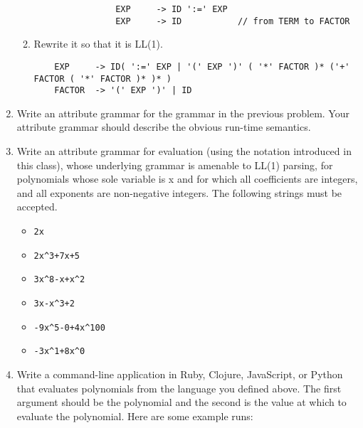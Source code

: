 \documentclass{article}
\begin{document}
\begin{enumerate}
\begin{enumerate}
            \begin{verbatim}
                EXP     -> ID ':=' EXP
                EXP     -> ID           // from TERM to FACTOR
            \end{verbatim}
            \item Rewrite it so that it is LL(1).
\begin{verbatim}
    EXP     -> ID( ':=' EXP | '(' EXP ')' ( '*' FACTOR )* ('+' FACTOR ( '*' FACTOR )* )* )
    FACTOR  -> '(' EXP ')' | ID
\end{verbatim}
        \end{enumerate}
    \pagebreak
    \item Write an attribute grammar for the grammar in the previous problem. Your attribute grammar should describe the obvious run-time semantics.
        
    \pagebreak
    \item Write an attribute grammar for evaluation (using the notation introduced in this class), whose underlying grammar is amenable to LL(1) parsing, for polynomials whose sole variable is x and for which all coefficients are integers, and all exponents are non-negative integers. The following strings must be accepted.
        \begin{itemize}
            \item \begin{verbatim}2x\end{verbatim}
            \item \begin{verbatim}2x^3+7x+5\end{verbatim}
            \item \begin{verbatim}3x^8-x+x^2\end{verbatim}
            \item \begin{verbatim}3x-x^3+2\end{verbatim}
            \item \begin{verbatim}-9x^5-0+4x^100\end{verbatim}
            \item \begin{verbatim}-3x^1+8x^0\end{verbatim}
        \end{itemize}
        
    \pagebreak
    \item Write a command-line application in Ruby, Clojure, JavaScript, or Python that evaluates polynomials from the language you defined above. The first argument should be the polynomial and the second is the value at which to evaluate the polynomial. Here are some example runs:

\end{enumerate}
\end{document}
